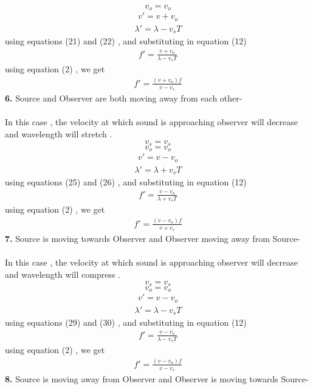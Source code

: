 \documentclass[journal,12pt,twocolumn]{IEEEtran}
\theoremstyle{remark}
\begin{document}
$$v_o = v_o$$
\begin{align}v'= v+v_o\end{align}
\begin{align}\lambda' = \lambda - v_s T\end{align}
using equations (21) and (22) , and substituting in equation (12) 
\begin{align}f' = \frac{v+v_o}{\lambda-v_s T}\end{align}
using equation (2) , we get 
\begin{align}f' = \frac{(v+v_o) f}{v-v_s }\end{align}
\textbf{6.} Source and Observer are both moving away from each other-\\\\
In this case , the velocity at which sound is approaching observer will decrease and wavelength will stretch .
$$v_s = v_s$$
$$v_o = v_o$$
\begin{align}v'= v-v_o\end{align}
\begin{align}\lambda' = \lambda + v_s T\end{align}
using equations (25) and (26) , and substituting in equation (12) 
\begin{align}f' = \frac{v-v_o}{\lambda+v_s T}\end{align}
using equation (2) , we get 
\begin{align}f' = \frac{(v-v_o) f}{v +v_s}\end{align}
\textbf{7.} Source is moving towards Observer and Observer moving away from Source-\\\\
In this case , the velocity at which sound is approaching observer will decrease and wavelength will compress .
$$v_s = v_s$$
$$v_o = v_o$$
\begin{align}v'= v-v_o\end{align}
\begin{align}\lambda' = \lambda - v_s T\end{align}
using equations (29) and (30) , and substituting in equation (12) 
\begin{align}f' = \frac{v-v_o}{\lambda-v_s T}\end{align}
using equation (2) , we get 
\begin{align}f' = \frac{(v-v_o) f}{v -v_s}\end{align}
\textbf{8.} Source is moving away from Observer and Observer is moving towards Source-\\\\
\end{document}
